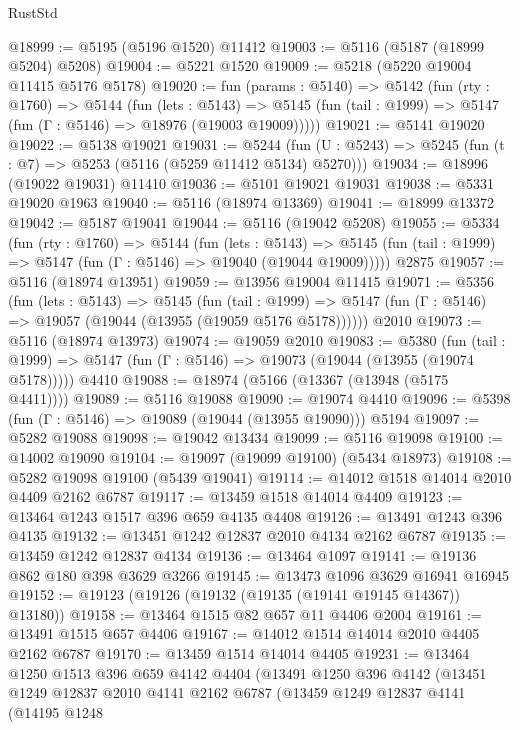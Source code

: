 \begin{lexlean}{RustStd}
\begin{coremodule}
{\begin{coremodule}
{{{{{{{{{{{{{{{{{{{{{{{{{{{{{{{@18999 := @5195 (@5196 @1520) @11412
@19003 := @5116 (@5187 (@18999 @5204) @5208)
@19004 := @5221 @1520
@19009 := @5218 (@5220 @19004 @11415 @5176 @5178)
@19020 := fun (params : @5140) =>
  @5142
    (fun (rty : @1760) =>
    @5144
      (fun (lets : @5143) =>
      @5145 (fun (tail : @1999) => @5147 (fun (Γ : @5146) => @18976 (@19003 @19009)))))
@19021 := @5141 @19020
@19022 := @5138 @19021
@19031 := @5244
    (fun (U : @5243) => @5245 (fun (t : @7) => @5253 (@5116 (@5259 @11412 @5134) @5270)))
@19034 := @18996 (@19022 @19031) @11410
@19036 := @5101 @19021 @19031
@19038 := @5331 @19020 @1963
@19040 := @5116 (@18974 @13369)
@19041 := @18999 @13372
@19042 := @5187 @19041
@19044 := @5116 (@19042 @5208)
@19055 := @5334
    (fun (rty : @1760) =>
    @5144
      (fun (lets : @5143) =>
      @5145 (fun (tail : @1999) => @5147 (fun (Γ : @5146) => @19040 (@19044 @19009)))))
    @2875
@19057 := @5116 (@18974 @13951)
@19059 := @13956 @19004 @11415
@19071 := @5356
    (fun (lets : @5143) =>
    @5145
      (fun (tail : @1999) =>
      @5147 (fun (Γ : @5146) => @19057 (@19044 (@13955 (@19059 @5176 @5178))))))
    @2010
@19073 := @5116 (@18974 @13973)
@19074 := @19059 @2010
@19083 := @5380
    (fun (tail : @1999) => @5147 (fun (Γ : @5146) => @19073 (@19044 (@13955 (@19074 @5178)))))
    @4410
@19088 := @18974 (@5166 (@13367 (@13948 (@5175 @4411))))
@19089 := @5116 @19088
@19090 := @19074 @4410
@19096 := @5398 (fun (Γ : @5146) => @19089 (@19044 (@13955 @19090))) @5194
@19097 := @5282 @19088
@19098 := @19042 @13434
@19099 := @5116 @19098
@19100 := @14002 @19090
@19104 := @19097 (@19099 @19100) (@5434 @18973)
@19108 := @5282 @19098 @19100 (@5439 @19041)
@19114 := @14012 @1518 @14014 @2010 @4409 @2162 @6787
@19117 := @13459 @1518 @14014 @4409
@19123 := @13464 @1243 @1517 @396 @659 @4135 @4408
@19126 := @13491 @1243 @396 @4135
@19132 := @13451 @1242 @12837 @2010 @4134 @2162 @6787
@19135 := @13459 @1242 @12837 @4134
@19136 := @13464 @1097
@19141 := @19136 @862 @180 @398 @3629 @3266
@19145 := @13473 @1096 @3629 @16941 @16945
@19152 := @19123 (@19126 (@19132 (@19135 (@19141 @19145 @14367)) @13180))
@19158 := @13464 @1515 @82 @657 @11 @4406 @2004
@19161 := @13491 @1515 @657 @4406
@19167 := @14012 @1514 @14014 @2010 @4405 @2162 @6787
@19170 := @13459 @1514 @14014 @4405
@19231 := @13464
    @1250
    @1513
    @396
    @659
    @4142
    @4404
    (@13491
      @1250
      @396
      @4142
      (@13451
        @1249
        @12837
        @2010
        @4141
        @2162
        @6787
        (@13459
          @1249
          @12837
          @4141
          (@14195
            @1248
}}}}}}}}}}}}}}}}}}}}}}}}}}}}}}}
\end{coremodule}}
\end{coremodule}
\end{lexlean}
